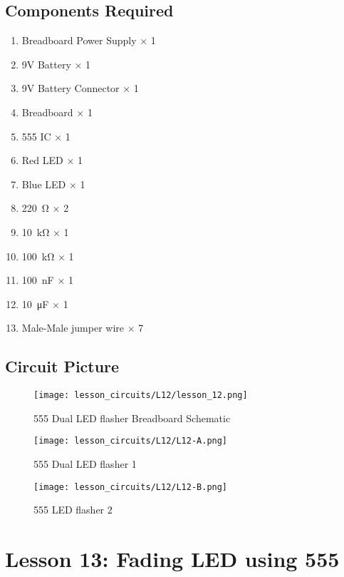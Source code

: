 \subsection{Components Required}
\begin{enumerate}
    \item Breadboard Power Supply $\times$ 1
    \item 9V Battery $\times$ 1
    \item 9V Battery Connector $\times$ 1
    \item Breadboard $\times$ 1
    \item 555 IC $\times$ 1
    \item Red LED $\times$ 1
    \item Blue LED $\times$ 1
    \item \SI{220}{\ohm} $\times$ 2
    \item \SI{10}{\kilo\ohm} $\times$ 1
    \item \SI{100}{\kilo\ohm} $\times$ 1
    \item \SI{100}{\nano\farad} $\times$ 1
    \item \SI{10}{\micro\farad} $\times$ 1
    \item Male-Male jumper wire $\times$ 7
\end{enumerate}
\subsection{Circuit Picture}
\begin{figure}[!h]
    \centering
    \texttt{[image: lesson\_circuits/L12/lesson\_12.png]}
    \caption{555 Dual LED flasher Breadboard Schematic}
    \label{fig:555_2led_sch}
\end{figure}
\begin{figure}[!h]
    \centering
    \texttt{[image: lesson\_circuits/L12/L12-A.png]}
    \caption{555 Dual LED flasher 1}
    \label{fig:555_2led_obb}
\end{figure}
\begin{figure}[!h]
    \centering
    \texttt{[image: lesson\_circuits/L12/L12-B.png]}
    \caption{555 LED flasher 2}
    \label{fig:555_2led_obb1}
\end{figure}

\section{Lesson 13: Fading LED using 555}

